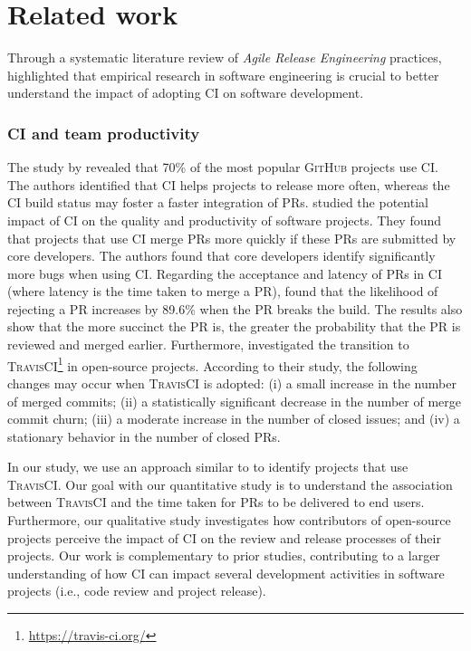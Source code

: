 \section{Related work}
\label{sec_related_work}

Through a systematic literature review of {\em Agile Release Engineering} practices, \cite{Karvonen201787} highlighted that empirical research in software engineering is crucial to better understand the impact of adopting CI on software development. 

\subsubsection*{\textbf{CI and team productivity}}

The study by \cite{Hilton2016-xy} revealed that 70\%
of the most popular \textsc{GitHub} projects use CI. The authors identified that CI helps projects to release more often, whereas the CI build status may foster a faster integration of PRs. \cite{Vasilescu2015-tn} studied the potential impact of CI on the quality and productivity of software projects. They found that projects that use CI merge PRs more quickly if these PRs are submitted by core developers. The authors found that core developers identify significantly more bugs when using CI. Regarding the acceptance and latency of PRs in CI (where latency is the time taken to merge a PR), \cite{Yu2016-cy} found that the likelihood of rejecting a PR increases by 89.6\% when the PR breaks the build. The results also show that the more succinct the PR is, the greater the probability that the PR is reviewed and merged earlier. 
Furthermore, \cite{zhao2017impact} investigated the transition to \textsc{TravisCI}\footnote{\url{https://travis-ci.org/}} in open-source projects. 
According to their study, the following changes may occur when \textsc{TravisCI} is adopted: (i) a small increase in the number of merged commits; (ii) a statistically significant decrease in the number of merge commit churn; (iii) a moderate increase in the number of closed issues; and (iv) a stationary behavior in the number of closed PRs. 

In our study, we use an approach similar to \cite{Vasilescu2015-tn} to identify projects that use \textsc{TravisCI}.  
Our goal with our quantitative study is to understand the association between \textsc{TravisCI} and the time taken for PRs to be delivered to end users. Furthermore, our qualitative study investigates how contributors of open-source projects perceive the impact of CI on the review and release processes of their projects.
Our work is complementary to prior studies, contributing to a larger understanding of how CI can impact several development activities in software projects (i.e., code review and project release).

